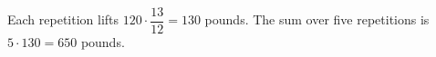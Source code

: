 Each repetition lifts $120\cdot\dfrac{13}{12}=130$ pounds. The sum over five repetitions is $5\cdot130=\boxed{650}$ pounds.
